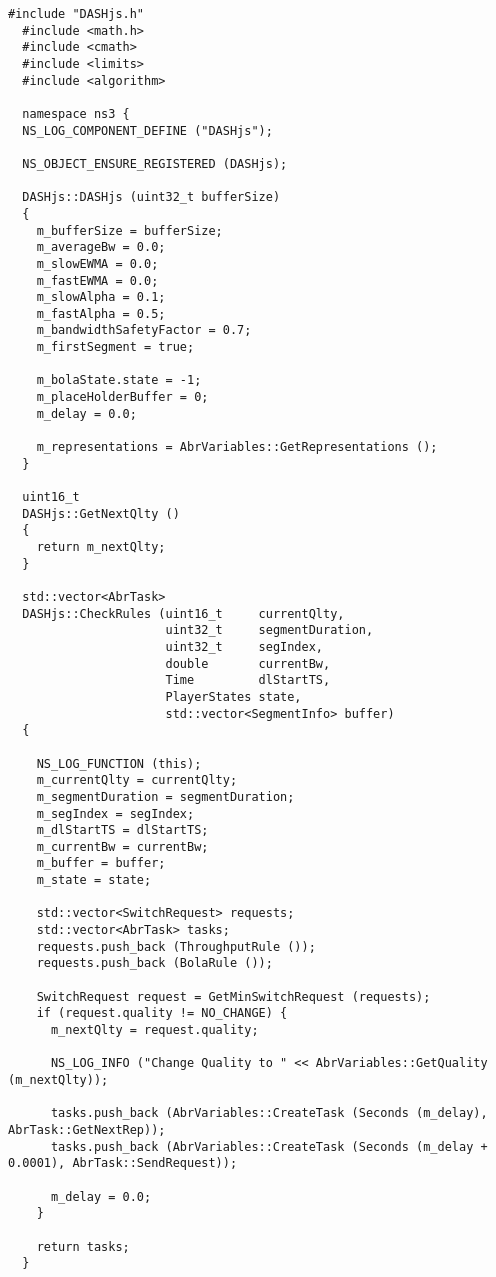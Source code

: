 \begin{lstlisting}[language=myC++, caption={DASHjs.cc}, captionpos=b]
  #include "DASHjs.h"
  #include <math.h>
  #include <cmath>
  #include <limits>
  #include <algorithm>
  
  namespace ns3 {
  NS_LOG_COMPONENT_DEFINE ("DASHjs");
  
  NS_OBJECT_ENSURE_REGISTERED (DASHjs);
  
  DASHjs::DASHjs (uint32_t bufferSize)
  {
    m_bufferSize = bufferSize;
    m_averageBw = 0.0;
    m_slowEWMA = 0.0;
    m_fastEWMA = 0.0;
    m_slowAlpha = 0.1;
    m_fastAlpha = 0.5;
    m_bandwidthSafetyFactor = 0.7;
    m_firstSegment = true;
  
    m_bolaState.state = -1;
    m_placeHolderBuffer = 0;
    m_delay = 0.0;
  
    m_representations = AbrVariables::GetRepresentations ();
  }
  
  uint16_t
  DASHjs::GetNextQlty ()
  {
    return m_nextQlty;
  }
  
  std::vector<AbrTask>
  DASHjs::CheckRules (uint16_t     currentQlty,
                      uint32_t     segmentDuration,
                      uint32_t     segIndex,
                      double       currentBw,
                      Time         dlStartTS,
                      PlayerStates state,
                      std::vector<SegmentInfo> buffer)
  {
  
    NS_LOG_FUNCTION (this);
    m_currentQlty = currentQlty;
    m_segmentDuration = segmentDuration;
    m_segIndex = segIndex;
    m_dlStartTS = dlStartTS;
    m_currentBw = currentBw;
    m_buffer = buffer;
    m_state = state;
  
    std::vector<SwitchRequest> requests;
    std::vector<AbrTask> tasks;
    requests.push_back (ThroughputRule ());
    requests.push_back (BolaRule ());
  
    SwitchRequest request = GetMinSwitchRequest (requests);
    if (request.quality != NO_CHANGE) {
      m_nextQlty = request.quality;
  
      NS_LOG_INFO ("Change Quality to " << AbrVariables::GetQuality (m_nextQlty));
  
      tasks.push_back (AbrVariables::CreateTask (Seconds (m_delay), AbrTask::GetNextRep));
      tasks.push_back (AbrVariables::CreateTask (Seconds (m_delay + 0.0001), AbrTask::SendRequest));
  
      m_delay = 0.0;
    }
  
    return tasks;
  }
  

\end{lstlisting}
